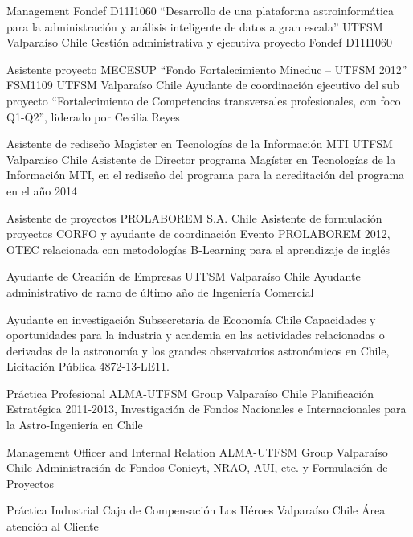 \documentclass[letter,10pt]{moderncv}
\begin{document}
        {Management Fondef D11I1060 “Desarrollo de una plataforma astroinformática
para la administración y análisis inteligente de datos a gran escala”}
        {UTFSM}
        {Valparaíso}
        {Chile}
        {Gestión administrativa y ejecutiva proyecto Fondef D11I1060}

        {Asistente proyecto MECESUP “Fondo Fortalecimiento Mineduc – UTFSM 2012” FSM1109}
        {UTFSM}
        {Valparaíso}
        {Chile}
        {Ayudante de coordinación ejecutivo del sub proyecto “Fortalecimiento de Competencias transversales profesionales, con foco Q1-Q2”, liderado por Cecilia Reyes}

        {Asistente de rediseño Magíster en Tecnologías de la Información MTI}
        {UTFSM}
        {Valparaíso}
        {Chile}
        {Asistente de Director programa Magíster en Tecnologías de la Información MTI, en el rediseño del programa para la acreditación del programa en el año 2014}

        {Asistente de proyectos}
        {PROLABOREM S.A.}
        {}
        {Chile}
        {Asistente de formulación proyectos CORFO y ayudante de coordinación Evento PROLABOREM 2012, OTEC relacionada con metodologías B-Learning para el aprendizaje de inglés}

        {Ayudante de Creación de Empresas}
        {UTFSM}
        {Valparaíso}
        {Chile}
        {Ayudante administrativo de ramo de último año de Ingeniería Comercial}

        {Ayudante en investigación}
        {Subsecretaría de Economía}
        {}
        {Chile}
        {Capacidades y oportunidades para la industria y academia en las actividades relacionadas o derivadas de la astronomía y los grandes observatorios astronómicos en Chile, Licitación Pública 4872-13-LE11.}

        {Práctica Profesional}
        {ALMA-UTFSM Group}
        {Valparaíso}
        {Chile}
        {Planificación Estratégica 2011-2013, Investigación de Fondos Nacionales e Internacionales para la Astro-Ingeniería en Chile}

        {Management Officer and Internal Relation}
        {ALMA-UTFSM Group}
        {Valparaíso}
        {Chile}
        {Administración de Fondos Conicyt, NRAO, AUI, etc. y Formulación de Proyectos}

        {Práctica Industrial}
        {Caja de Compensación Los Héroes}
        {Valparaíso}
        {Chile}
        {Área atención al Cliente}
\end{document}
